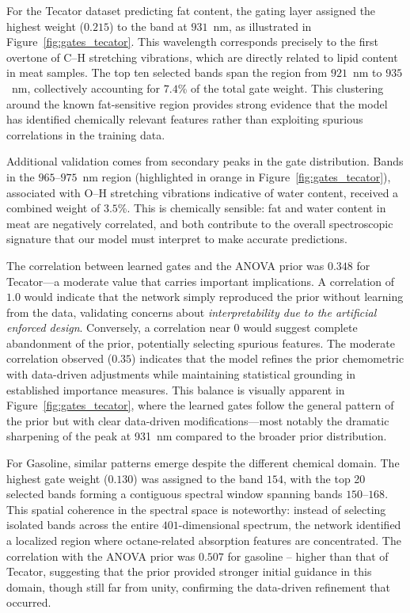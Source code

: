 \documentclass[preprint,12pt]{elsarticle}
\begin{document}
For the Tecator dataset predicting fat content, the gating layer assigned the highest weight ($0.215$) to the band at $931$~nm, as illustrated in Figure~\ref{fig:gates_tecator}. This wavelength corresponds precisely to the first overtone of C--H stretching vibrations, which are directly related to lipid content in meat samples. The top ten selected bands span the region from $921$~nm to $935$~nm, collectively accounting for $7.4$\% of the total gate weight. This clustering around the known fat-sensitive region provides strong evidence that the model has identified chemically relevant features rather than exploiting spurious correlations in the training data.

Additional validation comes from secondary peaks in the gate distribution. Bands in the $965$--$975$~nm region (highlighted in orange in Figure~\ref{fig:gates_tecator}), associated with O--H stretching vibrations indicative of water content, received a combined weight of $3.5$\%. This is chemically sensible: fat and water content in meat are negatively correlated, and both contribute to the overall spectroscopic signature that our model must interpret to make accurate predictions.

The correlation between learned gates and the ANOVA prior was $0.348$ for Tecator---a moderate value that carries important implications. A correlation of $1.0$ would indicate that the network simply reproduced the prior without learning from the data, validating concerns about {\em interpretability due to the artificial enforced design}. Conversely, a correlation near $0$ would suggest complete abandonment of the prior, potentially selecting spurious features. The moderate correlation observed ($0.35$) indicates that the model refines the prior chemometric with data-driven adjustments while maintaining statistical grounding in established importance measures. This balance is visually apparent in Figure~\ref{fig:gates_tecator}, where the learned gates follow the general pattern of the prior but with clear data-driven modifications---most notably the dramatic sharpening of the peak at 931~nm compared to the broader prior distribution.

For Gasoline, similar patterns emerge despite the different chemical domain. The highest gate weight ($0.130$) was assigned to the band $154$, with the top 20 selected bands forming a contiguous spectral window spanning bands $150$--$168$. This spatial coherence in the spectral space is noteworthy: instead of selecting isolated bands across the entire $401$-dimensional spectrum, the network identified a localized region where octane-related absorption features are concentrated. The correlation with the ANOVA prior was $0.507$ for gasoline -- higher than that of Tecator, suggesting that the prior provided stronger initial guidance in this domain, though still far from unity, confirming the data-driven refinement that occurred.
\end{document}

